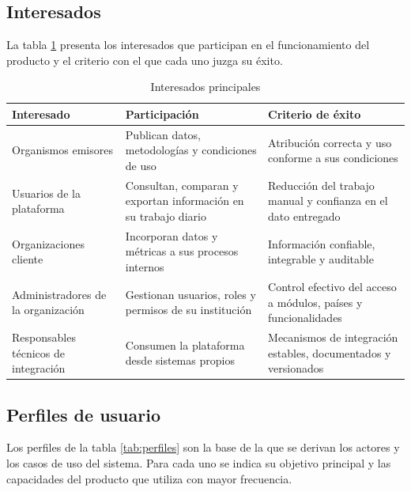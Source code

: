 \documentclass[11pt,a4paper]{article}
\begin{document}
\subsection{Interesados}

La tabla \ref{tab:interesados} presenta los interesados que participan en el
funcionamiento del producto y el criterio con el que cada uno juzga su
\'exito.

\begin{table}[htbp]
\centering
\caption{Interesados principales}
\label{tab:interesados}
\begin{tabularx}{\textwidth}{l X X}
\toprule
\textbf{Interesado} & \textbf{Participaci\'on} & \textbf{Criterio de \'exito} \\
\midrule
Organismos emisores & Publican datos, metodolog\'ias y condiciones de uso & Atribuci\'on correcta y uso conforme a sus condiciones \\
\addlinespace
Usuarios de la plataforma & Consultan, comparan y exportan informaci\'on en su trabajo diario & Reducci\'on del trabajo manual y confianza en el dato entregado \\
\addlinespace
Organizaciones cliente & Incorporan datos y m\'etricas a sus procesos internos & Informaci\'on confiable, integrable y auditable \\
\addlinespace
Administradores de la organizaci\'on & Gestionan usuarios, roles y permisos de su instituci\'on & Control efectivo del acceso a m\'odulos, pa\'ises y funcionalidades \\
\addlinespace
Responsables t\'ecnicos de integraci\'on & Consumen la plataforma desde sistemas propios & Mecanismos de integraci\'on estables, documentados y versionados \\
\bottomrule
\end{tabularx}
\end{table}

\subsection{Perfiles de usuario}

Los perfiles de la tabla \ref{tab:perfiles} son la base de la que se derivan los
actores y los casos de uso del sistema. Para cada uno se indica su objetivo
principal y las capacidades del producto que utiliza con mayor frecuencia.
\end{document}
